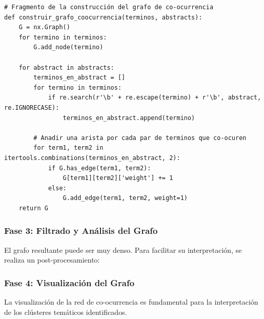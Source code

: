 \documentclass[10pt,a4paper]{article}
\begin{document}
\begin{verbatim}
# Fragmento de la construcción del grafo de co-ocurrencia
def construir_grafo_coocurrencia(terminos, abstracts):
    G = nx.Graph()
    for termino in terminos:
        G.add_node(termino)

    for abstract in abstracts:
        terminos_en_abstract = []
        for termino in terminos:
            if re.search(r'\b' + re.escape(termino) + r'\b', abstract, re.IGNORECASE):
                terminos_en_abstract.append(termino)
        
        # Anadir una arista por cada par de terminos que co-ocuren
        for term1, term2 in itertools.combinations(terminos_en_abstract, 2):
            if G.has_edge(term1, term2):
                G[term1][term2]['weight'] += 1
            else:
                G.add_edge(term1, term2, weight=1)
    return G
\end{verbatim}

\subsubsection{Fase 3: Filtrado y Análisis del Grafo}
El grafo resultante puede ser muy denso. Para facilitar su interpretación, se realiza un post-procesamiento:

\subsubsection{Fase 4: Visualización del Grafo}
La visualización de la red de co-ocurrencia es fundamental para la interpretación de los clústeres temáticos identificados.
\end{document}

